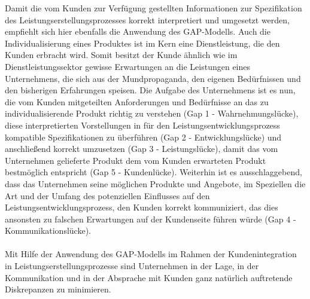\newpage
\noindent Damit die vom Kunden zur Verfügung gestellten Informationen zur Spezifikation des Leistungserstellungsprozesses korrekt interpretiert und umgesetzt werden, empfiehlt sich hier ebenfalls die Anwendung des GAP-Modells. Auch die Individualisierung eines Produktes ist im Kern eine Dienstleistung, die den Kunden erbracht wird. Somit besitzt der Kunde ähnlich wie im Dienstleistungssektor gewisse Erwartungen an die Leistungen eines Unternehmens, die sich aus der Mundpropaganda, den eigenen Bedürfnissen und den bisherigen Erfahrungen speisen. Die Aufgabe des Unternehmens ist es nun, die vom Kunden mitgeteilten Anforderungen und Bedürfnisse an das zu individualisierende Produkt richtig zu verstehen (Gap 1 - Wahrnehmungslücke), diese interpretierten Vorstellungen in für den Leistungsentwicklungsprozess kompatible Spezifikationen zu überführen (Gap 2 - Entwicklungslücke) und anschließend korrekt umzusetzen (Gap 3 - Leistungslücke), damit das vom Unternehmen gelieferte Produkt dem vom Kunden erwarteten Produkt bestmöglich entspricht (Gap 5 - Kundenlücke). Weiterhin ist es ausschlaggebend, dass das Unternehmen seine möglichen Produkte und Angebote, im Speziellen die Art und der Umfang des potenziellen Einflusses auf den Leistungsentwicklungsprozess, den Kunden korrekt kommuniziert, das dies ansonsten zu falschen Erwartungen auf der Kundenseite führen würde (Gap 4 - Kommunikationslücke).
\\ \\
Mit Hilfe der Anwendung des GAP-Modells im Rahmen der Kundenintegration in Leistungserstellungsprozesse sind Unternehmen in der Lage, in der Kommunikation und in der Absprache mit Kunden ganz natürlich auftretende Diskrepanzen zu minimieren.



